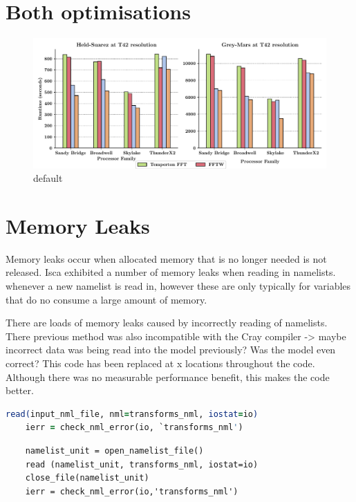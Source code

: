 \documentclass[a4paper,11pt]{report}
\begin{document}
\section{Both optimisations}

\begin{figure}[htbp]
\begin{center}
\includegraphics[width=\textwidth]{img/opt_comparison.pdf}
\caption{default}
\label{default}
\end{center}
\end{figure}











\section{Memory Leaks}
Memory leaks occur when allocated memory that is no longer needed is not released. Isca exhibited a number of memory leaks when reading in namelists. whenever a new namelist is read in, however these are only typically for variables that do no consume a large amount of memory. 
\par
There are loads of memory leaks caused by incorrectly reading of namelists. There previous method was also incompatible with the Cray compiler -> maybe incorrect data was being read into the model previously? Was the model even correct? This code has been replaced at x locations throughout the code. Although there was no measurable performance benefit, this makes the code better.

\begin{lstlisting}[language=Fortran]
    read(input_nml_file, nml=transforms_nml, iostat=io)
    ierr = check_nml_error(io, `transforms_nml')
\end{lstlisting}

\begin{lstlisting}
    namelist_unit = open_namelist_file()
    read (namelist_unit, transforms_nml, iostat=io)
    close_file(namelist_unit)
    ierr = check_nml_error(io,'transforms_nml')
\end{lstlisting}
\end{document}
